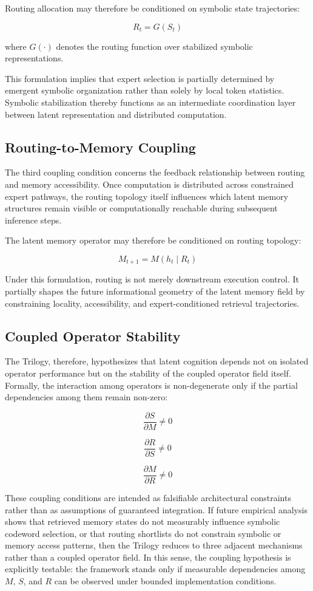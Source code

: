 Routing allocation may therefore be conditioned on symbolic state trajectories:

\[
R_t = G(S_t)
\]

where \(G(\cdot)\) denotes the routing function over stabilized symbolic representations.

This formulation implies that expert selection is partially determined by emergent symbolic organization rather than solely by local token statistics. Symbolic stabilization thereby functions as an intermediate coordination layer between latent representation and distributed computation.

\subsection*{Routing-to-Memory Coupling}
The third coupling condition concerns the feedback relationship between routing and memory accessibility. Once computation is distributed across constrained expert pathways, the routing topology itself influences which latent memory structures remain visible or computationally reachable during subsequent inference steps.

The latent memory operator may therefore be conditioned on routing topology:

\[
M_{t+1} = M(h_t \mid R_t)
\]

Under this formulation, routing is not merely downstream execution control. It partially shapes the future informational geometry of the latent memory field by constraining locality, accessibility, and expert-conditioned retrieval trajectories.

\subsection*{Coupled Operator Stability}
The Trilogy, therefore, hypothesizes that latent cognition depends not on isolated operator performance but on the stability of the coupled operator field itself. Formally, the interaction among operators is non-degenerate only if the partial dependencies among them remain non-zero:

\[
\frac{\partial S}{\partial M} \neq 0
\]

\[
\frac{\partial R}{\partial S} \neq 0
\]

\[
\frac{\partial M}{\partial R} \neq 0
\]

These coupling conditions are intended as falsifiable architectural constraints rather than as assumptions of guaranteed integration. If future empirical analysis shows that retrieved memory states do not measurably influence symbolic codeword selection, or that routing shortlists do not constrain symbolic or memory access patterns, then the Trilogy reduces to three adjacent mechanisms rather than a coupled operator field. In this sense, the coupling hypothesis is explicitly testable: the framework stands only if measurable dependencies among \(M\), \(S\), and \(R\) can be observed under bounded implementation conditions.

